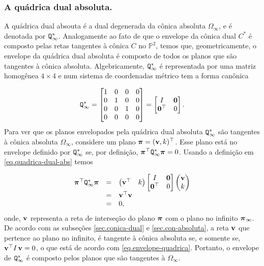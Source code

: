 \subsubsection{A quádrica dual absoluta.}\label{sec.quadrica-dual-abs}
A quádrica dual absouta é a dual degenerada da cônica absoluta $\Omega_\infty$, e é denotada por 
${\tt Q}^*_\infty$. Analogamente ao fato de que o envelope da cônica dual $C^*$ é composto pelas retas tangentes à cônica $C$ no ${\mathbb{P}}^2$, temos que, geometricamente,  o envelope da quádrica dual absoluta é composto de todos os planos que são tangentes à cônica absoluta. Algebricamente, 
${\tt Q}^*_\infty$ é representada por uma matriz homogênea $4\times4$ e num sistema de coordenadas métrico tem a forma canônica

\begin{equation}\label{eq.quadrica-dual-abs}
{\tt Q}^*_\infty=
\begin{bmatrix}
1&0&0&0\\
0&1&0&0\\
0&0&1&0\\
0&0&0&0
\end{bmatrix}=
\begin{bmatrix}
I&{\bf 0}\\
{\bf 0}^\top&0
\end{bmatrix}.
\end{equation}
Para ver que os planos envelopados pela quádrica dual absoluta ${\tt Q}^*_\infty$ são tangentes à cônica absoluta $\Omega_\infty$, considere um plano $\boldsymbol{\pi}=({\bf v}, k)^\top$. Esse plano está no envelope definido por ${\tt Q}^*_\infty$ se, por definição, $\boldsymbol{\pi}^\top {\tt Q}^*_\infty\boldsymbol{\pi}=0$. Usando a definição em \ref{eq.quadrica-dual-abs} temos

\begin{equation}\label{eq.envelope-quadrica}
\begin{array}{rcl}
\boldsymbol{\pi}^\top {\tt Q}^*_\infty\boldsymbol{\pi}&=&
\begin{pmatrix}
{\bf v}^\top&k
\end{pmatrix}
\begin{bmatrix}
I&{\bf 0}\\
{\bf 0}^\top&0
\end{bmatrix}
\begin{pmatrix}
{\bf v}\\
k
\end{pmatrix}\\
&=&{\bf v}^\top {\bf v}\\
&=&0,
\end{array}
\end{equation}
onde, ${\bf v}$ representa a reta de interseção do plano $\boldsymbol{\pi}$ com o plano no infinito $\boldsymbol{\pi}_\infty$. De acordo com as subseções \ref{sec.conica-dual} e \ref{sec.con-absoluta}, a reta ${\bf v}$ que pertence ao plano no infinito, é tangente à cônica absoluta se, e somente se, ${\bf v}^\top I\,{\bf v}=0$, o que está de acordo com \ref{eq.envelope-quadrica}. Portanto, o envelope de ${\tt Q}^*_\infty$ é composto pelos planos que são tangentes à $\Omega_\infty$. 

